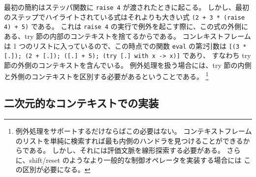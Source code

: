 \noindent 最初の簡約はステッパ関数に \texttt{raise 4} が渡されたときに起こる。
しかし、最初のステップでハイライトされている式はそれよりも大きい式
\texttt{(2 + 3 * (raise 4) + 5)} である。
これは \texttt{raise 4} の実行で例外を起こす際に、この式の外側にある、try 節の内部のコンテキストを捨てるからである。
コンレキストフレームは 1 つのリストに入っているので、この時点での関数 \texttt{eval} の第2引数は
\texttt{[(3 * [.]); (2 + [.]);\ ([.]\ + 5);\ (try [.]\ with x -> x)]} であり、
すなわち try 節の外側のコンテキストを含んでいる。
例外処理を扱う場合には、try 節の内側と外側のコンテキストを区別する必要があるということである。
\footnote{
例外処理をサポートするだけならばこの必要はない。
コンテキストフレームのリストを単純に検索すれば最も内側のハンドラを見つけることができるからである。
しかし、それには評価文脈を線形探索する必要がある。
さらに、shift/reset のようなより一般的な制御オペレータを実装する場合には
この区別が必要になる。
}

\subsection{二次元的なコンテキストでの実装}
\label{subsection:stepper__after}

